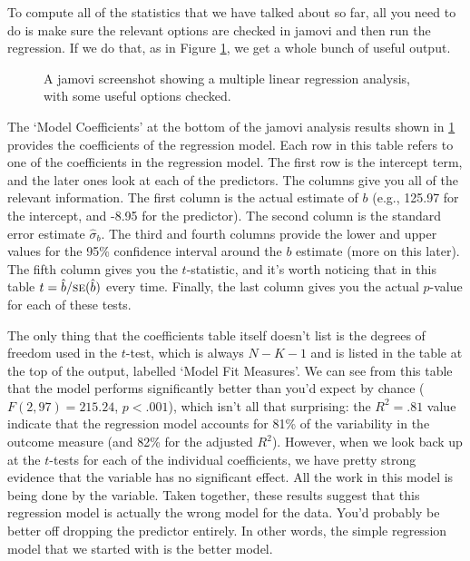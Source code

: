 
To compute all of the statistics that we have talked about so far, all you need to do is make sure the relevant options are checked in jamovi and then run the regression. If we do that, as in Figure \ref{fig:reg2}, we get a whole bunch of useful output.

\begin{figure}[!htb]
\begin{center}
\caption{A jamovi screenshot showing a multiple linear regression analysis, with some useful options checked.}
\HR
\label{fig:reg2}
\end{center}
\end{figure}

The `Model Coefficients' at the bottom of the jamovi analysis results shown in \ref{fig:reg2} provides the coefficients of the regression model. Each row in this table refers to one of the coefficients in the regression model. The first row is the intercept term, and the later ones look at each of the predictors. The columns give you all of the relevant information. The first column is the actual estimate of $b$ (e.g., 125.97 for the intercept, and -8.95 for the  predictor). The second column is the standard error estimate $\hat\sigma_b$. The third and fourth columns provide the lower and upper values for the 95\% confidence interval around the $b$ estimate (more on this later). The fifth column gives you the $t$-statistic, and it's worth noticing that in this table $t= \hat{b}/ \mbox{\textsc{se}}(\hat{b})$ every time. Finally, the last column gives you the actual $p$-value for each of these tests. 

The only thing that the coefficients table itself doesn't list is the degrees of freedom used in the $t$-test, which is always $N-K-1$ and is listed in the table at the top of the output, labelled `Model Fit Measures'. We can see from this table that the model performs significantly better than you'd expect by chance ($F(2,97) = 215.24$, $p<.001$), which isn't all that surprising: the $R^2 = .81$ value indicate that the regression model accounts for 81\% of the variability in the outcome measure (and 82\% for the adjusted $R^2$). However, when we look back up at the $t$-tests for each of the individual coefficients, we have pretty strong evidence that the  variable has no significant effect. All the work in this model is being done by the  variable. Taken together, these results suggest that this regression model is actually the wrong model for the data. You'd probably be better off dropping the  predictor entirely. In other words, the simple regression model that we started with is the better model.


